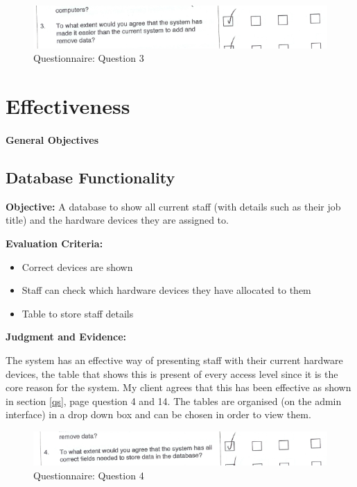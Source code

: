 \begin{figure}[H]
    \includegraphics[width=\textwidth]{./Evaluation/EvaluationQuestionnaire/3.png}
    \caption{Questionnaire: Question 3} 
\end{figure}

\section{Effectiveness}

\paragraph{General Objectives}

\subsection{Database Functionality}\label{staffhardware}

\textbf{Objective:} A database to show all current staff (with details such as their job title) and the hardware devices they are assigned to.

\textbf{Evaluation Criteria:}
\begin{itemize}
\item{Correct devices are shown}
\item{Staff can check which hardware devices they have allocated to them}
\item{Table to store staff details}
\end{itemize}

\textbf{Judgment and Evidence:}

The system has an effective way of presenting staff with their current hardware devices, the table that shows this is present of every access level since it is the core reason for the system. My client agrees that this has been effective as shown in section \ref{qs}, page \pageref{qs} question 4 and 14. The tables are organised (on the admin interface) in a drop down box and can be chosen in order to view them.

\begin{figure}[H]
    \includegraphics[width=\textwidth]{./Evaluation/EvaluationQuestionnaire/4.png}
    \caption{Questionnaire: Question 4} 
\end{figure}

